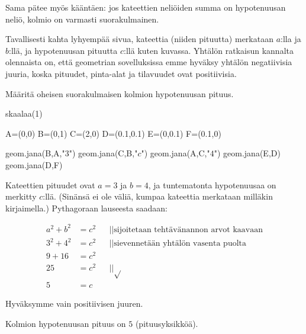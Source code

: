 Sama pätee myös kääntäen: jos kateettien neliöiden summa on hypotenuusan neliö, kolmio on varmasti suorakulmainen.

Tavallisesti kahta lyhyempää sivua, kateettia (niiden pituutta) merkataan $a$:lla ja $b$:llä, ja hypotenuusan pituutta $c$:llä kuten kuvassa. Yhtälön ratkaisun kannalta olennaista on, että geometrian sovelluksissa emme hyväksy yhtälön negatiivisia juuria, koska pituudet, pinta-alat ja tilavuudet ovat positiivisia.

\begin{esimerkki}

Määritä oheisen suorakulmaisen kolmion hypotenuusan pituus.
\begin{center}
\begin{kuva}
	skaalaa(1)

	A=(0,0)
	B=(0,1)
	C=(2,0)
	D=(0.1,0.1)
	E=(0,0.1)
	F=(0.1,0)

	geom.jana(B,A,"$3$")
	geom.jana(C,B,"$c$")
	geom.jana(A,C,"$4$")
	geom.jana(E,D)
	geom.jana(D,F)
\end{kuva}
\end{center}

\begin{esimratk}
Kateettien pituudet ovat $a=3$ ja $b=4$, ja tuntematonta hypotenuusaa on merkitty $c$:llä. (Sinänsä ei ole väliä, kumpaa kateettia merkataan milläkin kirjaimella.) Pythagoraan lauseesta saadaan:

\begin{align*}
a^2+b^2 &= c^2  && || \text{sijoitetaan tehtävänannon arvot kaavaan} \\
3^2+4^2 &= c^2 && || \text{sievennetään yhtälön vasenta puolta} \\
9+16 &= c^2 && \\
25 &= c^2 && || \sqrt{} \\
5 &= c &&
\end{align*}

Hyväksymme vain positiivisen juuren.

\end{esimratk}
\begin{esimvast}
Kolmion hypotenuusan pituus on $5$ (pituusyksikköä).
\end{esimvast}

\end{esimerkki}

